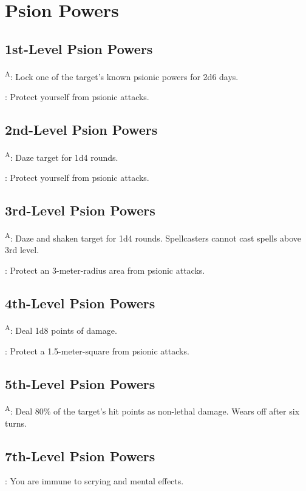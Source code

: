 \section{Psion Powers}



\subsection{1st-Level Psion Powers}

\textsuperscript{A}: Lock one of the target's known psionic powers for 2d6 days.

: Protect yourself from psionic attacks.



\subsection{2nd-Level Psion Powers}

\textsuperscript{A}: Daze target for 1d4 rounds.

: Protect yourself from psionic attacks.



\subsection{3rd-Level Psion Powers}

\textsuperscript{A}: Daze and shaken target for 1d4 rounds. Spellcasters cannot cast spells above 3rd level.

: Protect an 3-meter-radius area from psionic attacks.



\subsection{4th-Level Psion Powers}

\textsuperscript{A}: Deal 1d8 points of damage.

: Protect a 1.5-meter-square from psionic attacks.



\subsection{5th-Level Psion Powers}

\textsuperscript{A}: Deal 80\% of the target's hit points as non-lethal damage. Wears off after six turns.


\subsection{7th-Level Psion Powers}

: You are immune to scrying and mental effects.
